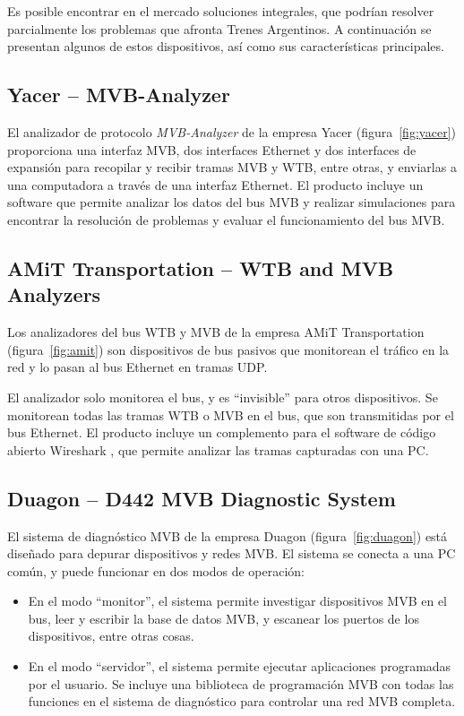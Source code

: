 Es posible encontrar en el mercado soluciones integrales, que podrían resolver parcialmente los problemas que afronta Trenes Argentinos. A continuación se presentan algunos de estos dispositivos, así como sus características principales.

\subsection{Yacer -- MVB-Analyzer}

El analizador de protocolo \textit{MVB-Analyzer} de la empresa Yacer \cite{yacer} (figura~\ref{fig:yacer}) proporciona una interfaz MVB, dos interfaces Ethernet y dos interfaces de expansión para recopilar y recibir tramas MVB y WTB, entre otras, y enviarlas a una computadora a través de una interfaz Ethernet. El producto incluye un software que permite analizar los datos del bus MVB y realizar simulaciones para encontrar la resolución de problemas y evaluar el funcionamiento del bus MVB.

\subsection{AMiT Transportation -- WTB and MVB Analyzers}

Los analizadores del bus WTB y MVB de la empresa AMiT Transportation \cite{amit} (figura~\ref{fig:amit}) son dispositivos de bus pasivos que monitorean el tráfico en la red y lo pasan al bus Ethernet en tramas UDP.

El analizador solo monitorea el bus, y es ``invisible'' para otros dispositivos. Se monitorean todas las tramas WTB o MVB en el bus, que son transmitidas por el bus Ethernet. El producto incluye un complemento para el software de código abierto Wireshark \cite{wireshark}, que permite analizar las tramas capturadas con una PC.

\subsection{Duagon -- D442 MVB Diagnostic System}

El sistema de diagnóstico MVB de la empresa Duagon \cite{duagon} (figura~\ref{fig:duagon}) está diseñado para depurar dispositivos y redes MVB. El sistema se conecta a una PC común, y puede funcionar en dos modos de operación:

\begin{itemize}
\item En el modo ``monitor'', el sistema permite investigar dispositivos MVB en el bus, leer y escribir la base de datos MVB, y escanear los puertos de los dispositivos, entre otras cosas.
\item En el modo ``servidor'', el sistema permite ejecutar aplicaciones programadas por el usuario. Se incluye una biblioteca de programación MVB con todas las funciones en el sistema de diagnóstico para controlar una red MVB completa.
\end{itemize}


